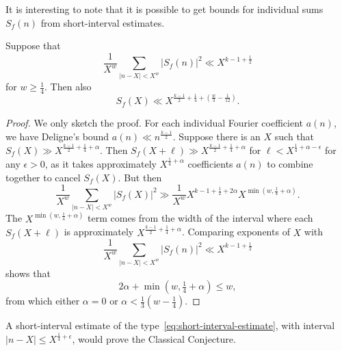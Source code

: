 It is interesting to note that it is possible to get bounds for individual sums $S_f(n)$
from short-interval estimates.


\begin{proposition}
  Suppose that
  \begin{equation}
    \frac{1}{X^w} \sum_{\lvert n - X \rvert < X^w} \lvert S_f(n) \rvert^2 \ll X^{k - 1 +
    \frac{1}{2}}
  \end{equation}
  for $w \geq \frac{1}{4}$.
  Then also
  \begin{equation}
    S_f(X) \ll X^{\frac{k-1}{2} + \frac{1}{4} + (\frac{w}{3} - \frac{1}{12})}.
  \end{equation}
\end{proposition}


\begin{proof}
  We only sketch the proof.
  For each individual Fourier coefficient $a(n)$, we have Deligne's bound $a(n) \ll
  n^{\frac{k-1}{2}}$.
  Suppose there is an $X$ such that $S_f(X) \gg X^{\frac{k-1}{2} + \frac{1}{4} + \alpha}$.
  Then $S_f(X + \ell) \gg X^{\frac{k-1}{2} + \frac{1}{4} + \alpha}$ for $\ell <
  X^{\frac{1}{4} + \alpha - \epsilon}$ for any $\epsilon > 0$, as it takes approximately
  $X^{\frac{1}{4} + \alpha}$ coefficients $a(n)$ to combine together to cancel $S_f(X)$.
  But then
  \begin{equation}
    \frac{1}{X^w} \sum_{\lvert n - X \rvert < X^w} \lvert S_f(X) \rvert^2 \gg
    \frac{1}{X^w} X^{k-1 + \frac{1}{2} + 2\alpha} X^{\min(w, \frac{1}{4} + \alpha)}.
  \end{equation}
  The $X^{\min(w, \frac{1}{4} + \alpha)}$ term comes from the width of the interval where
  each $S_f(X + \ell)$ is approximately $X^{\frac{k-1}{2} + \frac{1}{4} + \alpha}$.
  Comparing exponents of $X$ with
  \begin{equation}
    \frac{1}{X^w} \sum_{\lvert n - X \rvert < X^w} \lvert S_f(n) \rvert^2 \ll X^{k - 1 +
    \frac{1}{2}}
  \end{equation}
  shows that
  \begin{equation}
    2\alpha + \min(w, \tfrac{1}{4} + \alpha) \leq w,
  \end{equation}
  from which either $\alpha = 0$ or $\alpha < \tfrac{1}{3}( w - \tfrac{1}{4})$.
\end{proof}


\begin{corollary}
  A short-interval estimate of the type~\eqref{eq:short-interval-estimate}, with interval
  $\lvert n-X \rvert \leq X^{\frac{1}{4} + \epsilon}$, would prove the Classical
  Conjecture.
\end{corollary}

